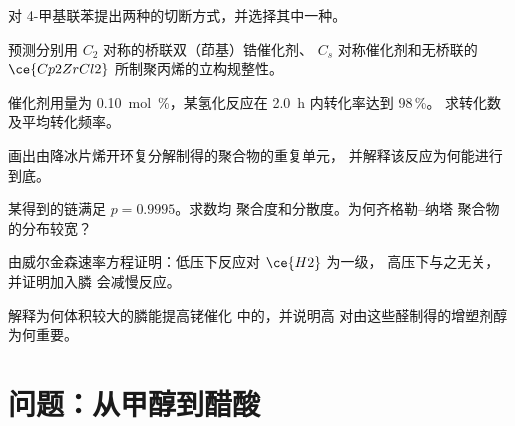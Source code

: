 \begin{exercise}[$\star\star$]\label{exo:b3:homogeneous-catalysis:6}
对 4-甲基联苯提出两种的切断方式，并选择其中一种。
\end{exercise}

\begin{exercise}[$\star\star$]\label{exo:b3:homogeneous-catalysis:7}
预测分别用 $C_2$ 对称的桥联双（茚基）锆催化剂、
$C_s$ 对称催化剂和无桥联的 $\ce{Cp2ZrCl2}$ 所制聚丙烯的立构规整性。
\end{exercise}

\begin{exercise}[$\star\star$]\label{exo:b3:homogeneous-catalysis:8}
催化剂用量为 \qty{0.10}{mol\%}，某氢化反应在 \qty{2.0}{h} 内转化率达到 98\,\%。
求转化数及平均转化频率。
\end{exercise}

\begin{exercise}[$\star\star$]\label{exo:b3:homogeneous-catalysis:9}
画出由降冰片烯开环复分解制得的聚合物的重复单元，
并解释该反应为何能进行到底。
\end{exercise}

\begin{exercise}[$\star\star\star$]\label{exo:b3:homogeneous-catalysis:10}
某得到的链满足 $p = 0.9995$。求数均
聚合度和分散度。为何齐格勒–纳塔
聚合物的分布较宽？
\end{exercise}

\begin{exercise}[$\star\star\star$]\label{exo:b3:homogeneous-catalysis:11}
由威尔金森速率方程证明：低压下反应对 $\ce{H2}$ 为一级，
高压下与之无关，并证明加入膦
会减慢反应。
\end{exercise}

\begin{exercise}[$\star\star\star$]\label{exo:b3:homogeneous-catalysis:12}
解释为何体积较大的膦能提高铑催化
中的，并说明高
对由这些醛制得的增塑剂醇为何重要。
\end{exercise}

\section{问题：从甲醇到醋酸}

